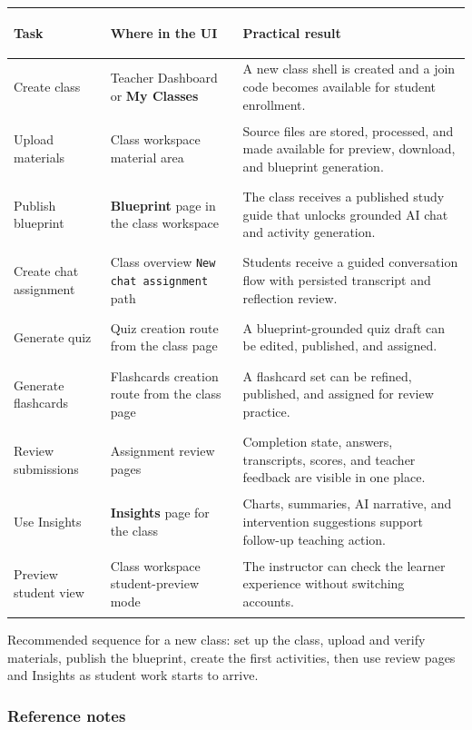 \documentclass[11pt,a4paper]{article}
\begin{document}
\begin{table}[H]
\centering
\small
\begin{tabularx}{\textwidth}{>{\bfseries\raggedright\arraybackslash}p{2.8cm}>{\raggedright\arraybackslash}p{3.9cm}X}
\toprule
Task & Where in the UI & Practical result \\
\midrule
Create class & Teacher Dashboard or \textbf{My Classes} & A new class shell is created and a join code becomes available for student enrollment. \\
Upload materials & Class workspace material area & Source files are stored, processed, and made available for preview, download, and blueprint generation. \\
Publish blueprint & \textbf{Blueprint} page in the class workspace & The class receives a published study guide that unlocks grounded AI chat and activity generation. \\
Create chat assignment & Class overview \texttt{New chat assignment} path & Students receive a guided conversation flow with persisted transcript and reflection review. \\
Generate quiz & Quiz creation route from the class page & A blueprint-grounded quiz draft can be edited, published, and assigned. \\
Generate flashcards & Flashcards creation route from the class page & A flashcard set can be refined, published, and assigned for review practice. \\
Review submissions & Assignment review pages & Completion state, answers, transcripts, scores, and teacher feedback are visible in one place. \\
Use Insights & \textbf{Insights} page for the class & Charts, summaries, AI narrative, and intervention suggestions support follow-up teaching action. \\
Preview student view & Class workspace student-preview mode & The instructor can check the learner experience without switching accounts. \\
\bottomrule
\end{tabularx}
\end{table}

\noindent Recommended sequence for a new class: set up the class, upload and verify materials,
publish the blueprint, create the first activities, then use review pages and Insights as student
work starts to arrive.

\subsubsection*{Reference notes}
\end{document}
